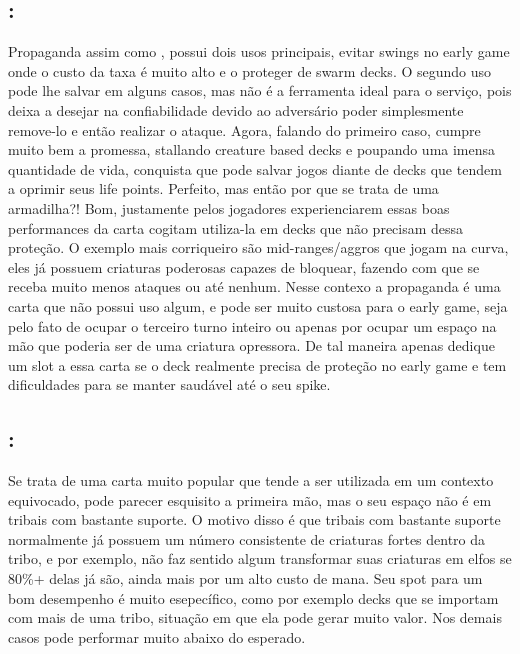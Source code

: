 \subsection{:} Propaganda assim como , possui dois usos principais, evitar swings no early game onde o custo da taxa é muito alto e o proteger de swarm decks.
O segundo uso pode lhe salvar em alguns casos, mas não é a ferramenta ideal para o serviço, pois deixa a desejar na confiabilidade devido ao adversário poder simplesmente remove-lo e então realizar o ataque.
Agora, falando do primeiro caso, cumpre muito bem a promessa, stallando creature based decks e poupando uma imensa quantidade de vida, conquista que pode salvar jogos diante de decks que tendem a oprimir seus life points.
Perfeito, mas então por que se trata de uma armadilha?! Bom, justamente pelos jogadores experienciarem essas boas performances da carta cogitam utiliza-la em decks que não precisam dessa proteção.
O exemplo mais corriqueiro são mid-ranges/aggros que jogam na curva, eles já possuem criaturas poderosas capazes de bloquear, fazendo com que se receba muito menos ataques ou até nenhum.
Nesse contexo a propaganda é uma carta que não possui uso algum, e pode ser muito custosa para o early game, seja pelo fato de ocupar o terceiro turno inteiro ou apenas por ocupar um espaço na mão que poderia ser de uma criatura opressora.
De tal maneira apenas dedique um slot a essa carta se o deck realmente precisa de proteção no early game e tem dificuldades para se manter saudável até o seu spike.

\subsection{:} Se trata de uma carta muito popular que tende a ser utilizada em um contexto equivocado, pode parecer esquisito a primeira mão, mas o seu espaço não é em tribais com bastante suporte.
O motivo disso é que tribais com bastante suporte normalmente já possuem um número consistente de criaturas fortes dentro da tribo, e por exemplo, não faz sentido algum transformar suas criaturas em elfos se 80\%+ delas já são, ainda mais por um alto custo de mana.
Seu spot para um bom desempenho é muito esepecífico, como por exemplo decks que se importam com mais de uma tribo, situação em que ela pode gerar muito valor. Nos demais casos pode performar muito abaixo do esperado.